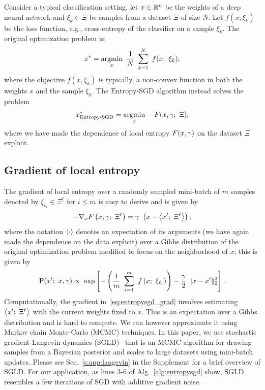 \documentclass[10pt]{article}
\newcommand{\entropysgd}{\mathrm{Entropy}\textrm{-}\mathrm{SGD}}
\newcommand{\minibatch}[1]{\Xi^{#1}}
\begin{document}
Consider a typical classification setting, let $x \in \mathbb{R}^n$ be the weights of a deep neural network and $\xi_k \in \Xi$ be samples from a dataset $\Xi$ of size $N$. Let $f(x; \xi_k)$ be the loss function, e.g., cross-entropy of the classifier on a sample $\xi_k$. The original optimization problem is:
\begin{equation}
    x^* = \operatorname*{argmin}_x\ \frac{1}{N}\ \sum_{k=1}^N\ f(x;\ \xi_k);
    \label{eq:dnn_objective}
\end{equation}
where the objective $f(x, \xi_k)$ is typically, a non-convex function in both the weights $x$ and the sample $\xi_k$. The $\entropysgd$ algorithm instead solves the problem
\begin{equation}
    x^*_{\entropysgd} = \argmin_x\ -F(x, \gamma;\ \Xi);
    \label{eq:entropysgd_objective}
\end{equation}
where we have made the dependence of local entropy $F(x,\gamma)$ on the dataset $\Xi$ explicit.

\subsection{Gradient of local entropy}
\label{ss:grad_local_entropy}

The gradient of local entropy over a randomly sampled mini-batch of $m$ samples denoted by $\xi_{\ell_i} \in \minibatch{\ell}$ for $i \leq m$ is easy to derive and is given by
\begin{equation}
    -\nabla_x F\rbrac{x, \g;\ \minibatch{\ell}} = \g\ \rbrac{x - \ag{x';\ \minibatch{\ell}}};
    \label{eq:entropysgd_grad}
\end{equation}
where the notation $\left\langle\cdot\right\rangle$ denotes an expectation of its arguments (we have again made the dependence on the data explicit) over a Gibbs distribution of the original optimization problem modified to focus on the neighborhood of $x$; this is given by
\begin{equation}
    \P(x';\ x, \g) \propto\ \exp \sqbrac{-\rbrac{\f{1}{m}\ \sum_{i=1}^m\ f\rbrac{x;\ \xi_{\ell_i}}} - \f{\g}{2}\ \norm{x-x'}_2^2}.
    \label{eq:entropysgd_modified_gibbs}
\end{equation}
Computationally, the gradient in~\eqref{eq:entropysgd_grad} involves estimating $\ag{x';\ \minibatch{\ell}}$ with the current weights fixed to $x$. This is an expectation over a Gibbs distribution and is hard to compute. We can however approximate it using Markov chain Monte-Carlo (MCMC) techniques. In this paper, we use stochastic gradient Langevin dynamics (SGLD)~\citep{welling2011bayesian} that is an MCMC algorithm for drawing samples from a Bayesian posterior and scales to large datasets using mini-batch updates. Please see Sec.~\ref{s:app:langevin} in the Supplement for a brief overview of SGLD. For our application, as lines 3-6 of Alg.~\ref{alg:entropysgd} show, SGLD resembles a few iterations of SGD with additive gradient noise.
\end{document}
